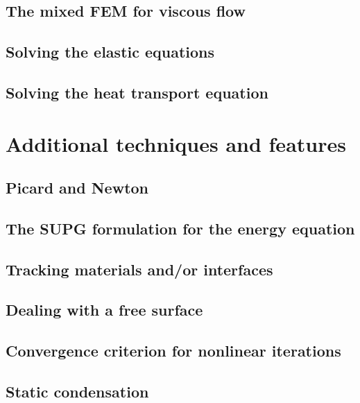 \documentclass[a4paper]{article}
\begin{document}
\subsection{The mixed FEM for viscous flow}  %
\subsection{Solving the elastic equations} %
\subsection{Solving the heat transport equation}  %




\newpage
\section{Additional techniques and features} %

\subsection{Picard and Newton}

\subsection{The SUPG formulation for the energy equation}

\subsection{Tracking materials and/or interfaces}

\subsection{Dealing with a free surface}

\subsection{Convergence criterion for nonlinear iterations}

\subsection{Static condensation} 
\end{document}
